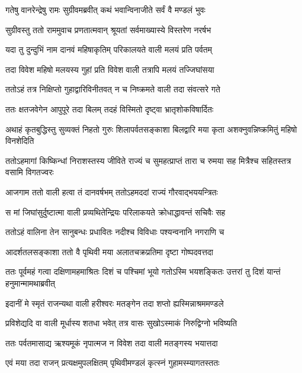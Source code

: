 
\twolineshloka
{गतेषु वानरेन्द्रेषु रामः सुग्रीवमब्रवीत्}
{कथं भवान्विनाजीते सर्वं वै मण्डलं भुवः} %

\twolineshloka
{सुग्रीवस्तु ततो राममुवाच प्रणतात्मवान्}
{श्रूयतां सर्वमाख्यास्ये विस्तरेण नरर्षभ} %

\twolineshloka
{यदा तु दुन्दुभिं नाम दानवं महिषाकृतिम्}
{परिकालयते वाली मलयं प्रति पर्वतम्} %

\twolineshloka
{तदा विवेश महिषो मलयस्य गुहां प्रति}
{विवेश वाली तत्रापि मलयं तज्जिघांसया} %

\twolineshloka
{ततोऽहं तत्र निक्षिप्तो गुहाद्वारिविनीतवत्}
{न च निष्क्रमते वाली तदा संवत्सरे गते} %

\twolineshloka
{ततः क्षतजवेगेन आपुपूरे तदा बिलम्}
{तदहं विस्मितो दृष्ट्वा भ्रातृशोकविषार्दितः} %

\threelineshloka
{अथाहं कृतबुद्धिस्तु सुव्यक्तं निहतो गुरुः}
{शिलापर्वतसङ्काशा बिलद्वारि मया कृता}
{अशक्नुवन्निष्क्रमितुं महिषो विनशेदिति} %

\threelineshloka
{ततोऽहमागां किष्किन्धां निराशस्तस्य जीविते}
{राज्यं च सुमहत्प्राप्तं तारा च रुमया सह}
{मित्रैश्च सहितस्तत्र वसामि विगतज्वरः} %

\twolineshloka
{आजगाम ततो वाली हत्वा तं दानवर्षभम्}
{ततोऽहमददां राज्यं गौरवाद्भययन्त्रितः} %

\twolineshloka
{स मां जिघांसुर्दुष्टात्मा वाली प्रव्यथितेन्द्रियः}
{परिलाकयते क्रोधाद्धावन्तं सचिवैः सह} %

\twolineshloka
{ततोऽहं वालिना तेन सानुबन्धः प्रधावितः}
{नदीश्च विविधाः पश्यन्वनानि नगराणि च} %

\twolineshloka
{आदर्शतलसङ्काशा ततो वै पृथिवी मया}
{अलातचक्रप्रतिमा दृष्टा गोष्पदवत्तदा} %

\threelineshloka
{ततः पूर्वमहं गत्वा दक्षिणामहमाश्रितः}
{दिशं च पश्चिमां भूयो गतोऽस्मि भयशङ्कितः}
{उत्तरां तु दिशं यान्तं हनुमान्मामथाब्रवीत्} %

\twolineshloka
{इदानीं मे स्मृतं राजन्यथा वाली हरीश्वरः}
{मतङ्गेन तदा शप्तो ह्यस्मिन्नाश्रममण्डले} %

\twolineshloka
{प्रविशेद्यदि वा वाली मूर्धास्य शतधा भवेत्}
{तत्र वासः सुखोऽस्माकं निरुद्विग्नो भविष्यति} %

\twolineshloka
{ततः पर्वतमासाद्य ऋश्यमूकं नृपात्मज}
{न विवेश तदा वाली मतङ्गस्य भयात्तदा} %

\twolineshloka
{एवं मया तदा राजन् प्रत्यक्षमुपलक्षितम्}
{पृथिवीमण्डलं कृत्स्नं गुहामस्म्यागतस्ततः} %


